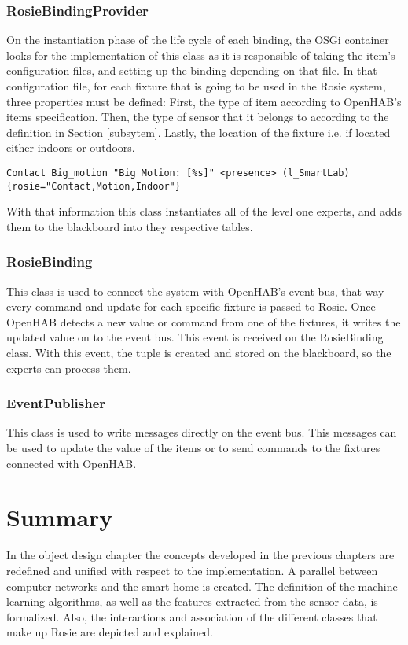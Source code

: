 \subsubsection{RosieBindingProvider}
\label{RosieGenericBindingProvider}
On the instantiation phase of the life cycle of each binding, the OSGi container looks for the implementation of this class as it is responsible of taking the item's configuration files, and setting up the binding depending on that file.  In that configuration file, for each fixture that is going to be used in the Rosie system, three properties must be defined: First, the type of item according to OpenHAB's items specification\cite{openhabItems}. Then, the type of sensor that it belongs to according to the definition in Section \ref{subsytem}. Lastly, the location of the fixture i.e. if located either indoors or outdoors. 


\begin{verbatim}
Contact Big_motion "Big Motion: [%s]" <presence> (l_SmartLab) 
{rosie="Contact,Motion,Indoor"}
\end{verbatim}

With that information this class instantiates all of the level one experts, and adds them to the blackboard into they respective tables.


\subsubsection{RosieBinding}
\label{RosieBinding}
This class is used to connect the system with OpenHAB's event bus, that way every command and update for each specific fixture is passed to Rosie. Once OpenHAB detects a new value or command from one of the fixtures, it writes the updated value on to the event bus. This event is received on the RosieBinding class. With this event, the tuple is created and stored on the blackboard, so the experts can process them.


\subsubsection{EventPublisher}
\label{EventPublisher}
This class is used to write messages directly on the event bus. This messages can be used to update the value of the items or to send commands to the fixtures connected with OpenHAB. 

\section{Summary}

In the object design chapter the concepts developed in the previous chapters are redefined and unified with respect to the implementation. A parallel between computer networks and the smart home is created. The definition of the machine learning algorithms, as well as the features extracted from the sensor data, is formalized. Also, the interactions and association of the different classes that make up Rosie are depicted and explained.
